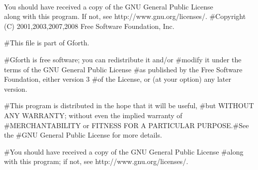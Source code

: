 \documentclass[10pt,english]{article}
\begin{document}
\\ You should have received a copy of the GNU General Public License
\\ along with this program. If not, see http://www.gnu.org/licenses/.
\nwendcode{}\nwdocspar
\nwenddocs{}\endmoddef
#Copyright (C) 2001,2003,2007,2008 Free Software Foundation, Inc.

#This file is part of Gforth.

#Gforth is free software; you can redistribute it and/or
#modify it under the terms of the GNU General Public License
#as published by the Free Software Foundation, either version 3
#of the License, or (at your option) any later version.

#This program is distributed in the hope that it will be useful,
#but WITHOUT ANY WARRANTY; without even the implied warranty of
#MERCHANTABILITY or FITNESS FOR A PARTICULAR PURPOSE.#See the
#GNU General Public License for more details.

#You should have received a copy of the GNU General Public License
#along with this program; if not, see http://www.gnu.org/licenses/.
\nwendcode{}
\end{document}

